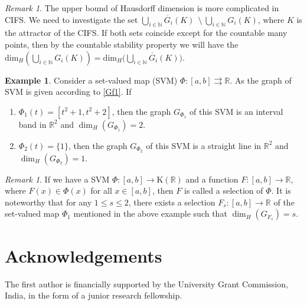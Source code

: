\documentclass[12pt,oneside,reqno]{amsart}
\theoremstyle{definition}
\newtheorem{example}[theorem]{Example}
\theoremstyle{remark}
\newtheorem{remark}[theorem]{Remark}
\begin{document}
 \begin{remark}
     The upper bound of Hausdorff dimension is more complicated in CIFS. We need to investigate the set $\overline{ \underset{i\in \mathbb{N}}{\bigcup}G_i(K)} ~~\setminus~
     \underset{i\in \mathbb{N}}{\bigcup}G_i(K)$, where $K$ is the attractor of the CIFS. If both sets coincide except for the countable many points, then by the countable stability property we will have the $\text{dim}_H(\underset{i\in \mathbb{N}}{\bigcup} G_i(K) )=\text{dim}_H\big( \overline{ \underset{i\in \mathbb{N}}{\bigcup}G_i(K)}\big).$ 
     \end{remark}

\begin{example}  Consider a set-valued map (SVM) $\Phi:[a,b]\rightrightarrows \mathbb{R}$. As the graph of SVM is given according to \eqref{Gf1}. If 
\begin{enumerate}
     \item $\Phi_1(t)=[t^2+1,t^2+2]$, then the graph $G_{\Phi_{1}}$ of this SVM is an interval band in $\mathbb{R}^2$ and $\dim_H(G_{\Phi_{1}})=2$.
    \item $\Phi_2(t)=\{1\}$, then the graph $G_{\Phi_{2}}$ of this SVM is a straight line in $\mathbb{R}^2$ and $\dim_H(G_{\Phi_{2}})=1$.

\end{enumerate}
    
\end{example}
\begin{remark}
    
If we have a SVM $\Phi : [a,b] \to \mathrm{K}(\mathbb{R})$ and a
function $F : [a,b] \to \mathbb{R}$, where $F(x) \in \Phi(x)$ for all $x\in [a,b]$, then $F$ is called a selection of $\Phi$. It is noteworthy that for any $1 \le s \le 2$, there exists a selection $F_{s} : [a,b] \to \mathbb{R}$ of the set-valued map $\Phi_1$ mentioned in the above example such that $\dim_H(G_{F_{s}})=s.$
\end{remark}

\section*{Acknowledgements}

 The first author is financially supported by the University Grant Commission, India, in the form of a junior research fellowship.

 
\end{document}
